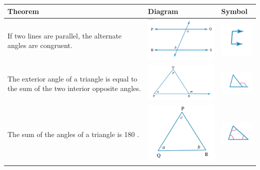 \documentclass{book}
\begin{document}
\begin{center}
\begin{tabular}{|p{5cm}|p{6cm}|p{2cm}|}
	\end{tabular}
	\begin{tabular}{|p{5cm}|p{6cm}|p{2cm}|}
		\hline
		Theorem                                                                                   & Diagram                                         & Symbol                                                 \\ \hline
		If two lines are parallel, the alternate angles are congruent.                            & \includegraphics[width=6cm]{geometry theorem 4} & \includegraphics[width=2cm]{geometry theorem 4 symbol} \\ \hline
		The exterior angle of a triangle is equal to the sum of the two interior opposite angles. & \includegraphics[width=6cm]{geometry theorem 5} & \includegraphics[width=2cm]{geometry theorem 5 symbol} \\ \hline
		The sum of the angles of a triangle is 180 \degree.                                       & \includegraphics[width=6cm]{geometry theorem 6} & \includegraphics[width=2cm]{geometry theorem 6 symbol} \\ \hline

\end{tabular}
\end{center}
\end{document}
